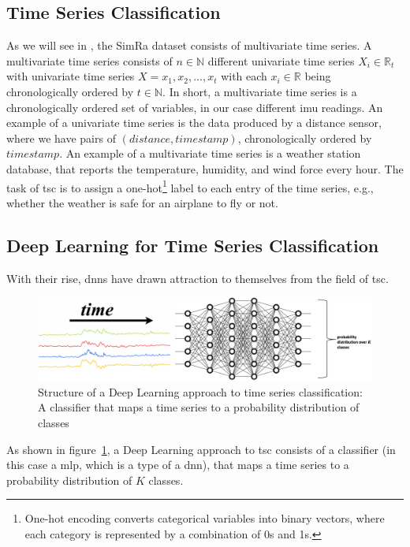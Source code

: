 \subsection{Time Series Classification}
As we will see in , the SimRa dataset consists of multivariate time series.
A multivariate time series consists of $n \in \mathbb{N}$ different univariate time series $X_{i} \in \mathbb{R}_{t}$ with univariate time series $X = x_{1}, x_{2},...,x_{t}$ with each $x_{i} \in \mathbb{R}$ being chronologically ordered by $t \in \mathbb{N}$.
In short, a multivariate time series is a chronologically ordered set of variables, in our case different \ac{imu} readings.
An example of a univariate time series is the data produced by a distance sensor, where we have pairs of $(distance,timestamp)$, chronologically ordered by $timestamp$.
An example of a multivariate time series is a weather station database, that reports the temperature, humidity, and wind force every hour.
The task of \ac{tsc} is to assign a one-hot\footnote{One-hot encoding converts categorical variables into binary vectors, where each category is represented by a combination of 0s and 1s.} label to each entry of the time series, e.g., whether the weather is safe for an airplane to fly or not.

\subsection{Deep Learning for Time Series Classification}
With their rise, \acp{dnn} have drawn attraction to themselves from the field of \ac{tsc}.

\begin{figure}
    \center
    \includegraphics[width=\columnwidth]{fig/deep_learning_structure.pdf}
    \caption{Structure of a Deep Learning approach to time series classification: A classifier that maps a time series to a probability distribution of classes~\cite{chen2021deep}}
    \label{fig:deep_learning_structure}
\end{figure}

As shown in figure~\ref{fig:deep_learning_structure}, a Deep Learning approach to \ac{tsc} consists of a classifier (in this case a \ac{mlp}, which is a type of a \ac{dnn}), that maps a time series to a probability distribution of $K$ classes.

